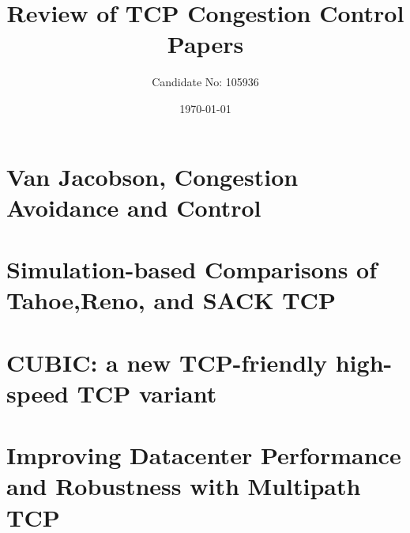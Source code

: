 \documentclass[a4paper,12pt]{scrartcl}
\title{Review of TCP Congestion Control Papers}
\author{Candidate No: 105936}
\date{\today}
\begin{document}
	
	\begin{titlepage}
		\maketitle
	\end{titlepage}
	
	\tableofcontents
	\newpage
	
	\section{Van Jacobson, Congestion Avoidance and Control}{}
	\section{Simulation-based Comparisons of Tahoe,Reno, and SACK TCP}{}
	\section{CUBIC: a new TCP-friendly high-speed TCP variant}{}
	\section{Improving Datacenter Performance and Robustness with Multipath TCP}{}
	\newpage
	
	\printbibliography[heading=bibintoc,title=References]
\end{document}

